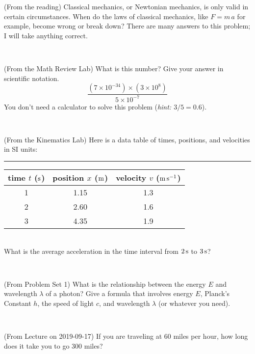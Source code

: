 \documentclass[12pt, letterpaper]{article}
\begin{document}
\begin{problem} (From the reading)
Classical mechanics, or Newtonian mechanics, is only valid in certain
circumstances. When do the laws of classical mechanics, like $F =
m\,a$ for example, become wrong or break down? There are many answers
to this problem; I will take anything correct.
\end{problem}


\vfill ~

\begin{problem} (From the Math Review Lab)
What is this number? Give your answer in scientific notation.
$$
\frac{(7\times10^{-34})\times(3\times10^8)}{5\times10^{-7}}
$$
You don't need a calculator to solve this problem (\textit{hint: $3/5=0.6$}).
\end{problem}


\vfill ~


\clearpage


\begin{problem} (From the Kinematics Lab)
Here is a data table of times, positions, and velocities in SI units:\\
\rule{1.0in}{0pt}\begin{tabular}{c|c|c}
time $t$ ($\mathrm{s}$) & position $x$ ($\mathrm{m}$) & velocity $v$ ($\mathrm{m}\,\mathrm{s}^{-1}$) \\
\hline
1 & 1.15 & 1.3 \\
2 & 2.60 & 1.6 \\
3 & 4.35 & 1.9 \\
\hline
\end{tabular}\\
What is the average acceleration in the time interval from $2\,\mathrm{s}$ to $3\,\mathrm{s}$?
\end{problem}


\vfill ~

\begin{problem} (From Problem Set 1)
What is the relationship between the energy $E$ and wavelength
$\lambda$ of a photon? Give a formula that involves energy $E$,
Planck's Constant $h$, the speed of light $c$, and wavelength
$\lambda$ (or whatever you need).
\end{problem}

\vfill ~

\begin{problem} (From Lecture on 2019-09-17)
If you are traveling at 60 miles per hour, how long does
it take you to go 300 miles?
\end{problem}


\vfill ~
\end{document}
